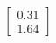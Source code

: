 \documentclass[preview]{standalone}
\begin{document}
\begin{align*}
\begin{bmatrix} 0.31 \\ 1.64 \end{bmatrix}
\end{align*}
\end{document}
